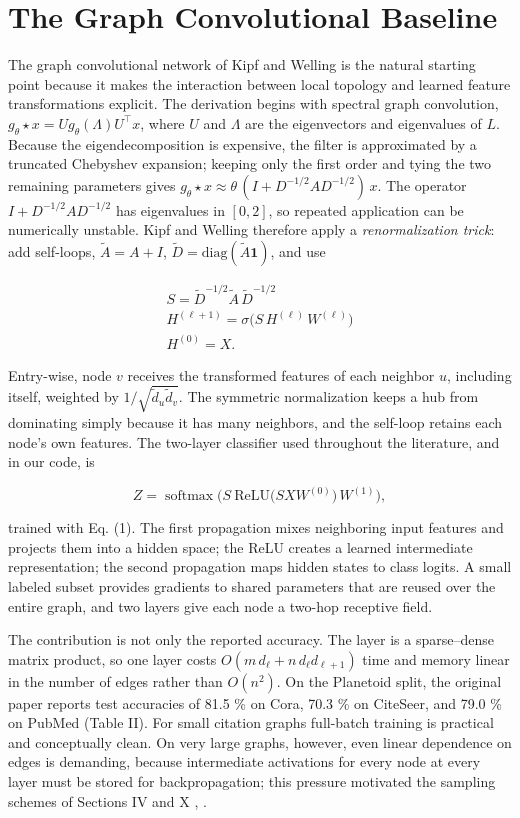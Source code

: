 \documentclass[conference]{IEEEtran}
\begin{document}
\section{The Graph Convolutional Baseline}

The graph convolutional network of Kipf and Welling \cite{b1} is the natural starting point because it makes the interaction between local topology and learned feature transformations explicit. The derivation begins with spectral graph convolution, \(g_\theta \star x = U g_\theta(\Lambda) U^\top x\), where \(U\) and \(\Lambda\) are the eigenvectors and eigenvalues of \(L\). Because the eigendecomposition is expensive, the filter is approximated by a truncated Chebyshev expansion; keeping only the first order and tying the two remaining parameters gives \(g_\theta\star x \approx \theta\,(I + D^{-1/2}AD^{-1/2})\,x\). The operator \(I + D^{-1/2}AD^{-1/2}\) has eigenvalues in \([0,2]\), so repeated application can be numerically unstable. Kipf and Welling therefore apply a \emph{renormalization trick}: add self-loops, \(\tilde A = A + I\), \(\tilde D = \mathrm{diag}(\tilde A\mathbf{1})\), and use

\[\begin{gathered}S = \tilde D^{-1/2}\tilde A\,\tilde D^{-1/2} \\ H^{(\ell+1)} = \sigma\big(S\,H^{(\ell)}\,W^{(\ell)}\big) \\ H^{(0)} = X.\end{gathered}\tag{4}\]

Entry-wise, node \(v\) receives the transformed features of each neighbor \(u\), including itself, weighted by \(1/\sqrt{\tilde d_u \tilde d_v}\). The symmetric normalization keeps a hub from dominating simply because it has many neighbors, and the self-loop retains each node's own features. The two-layer classifier used throughout the literature, and in our code, is

\[Z = \operatorname{softmax}\Big(S\ \mathrm{ReLU}\big(S X W^{(0)}\big)\, W^{(1)}\Big), \tag{5}\]

trained with Eq. (1). The first propagation mixes neighboring input features and projects them into a hidden space; the ReLU creates a learned intermediate representation; the second propagation maps hidden states to class logits. A small labeled subset provides gradients to shared parameters that are reused over the entire graph, and two layers give each node a two-hop receptive field.

The contribution is not only the reported accuracy. The layer is a sparse--dense matrix product, so one layer costs \(O(m\,d_\ell + n\,d_\ell d_{\ell+1})\) time and memory linear in the number of edges rather than \(O(n^2)\). On the Planetoid split, the original paper reports test accuracies of 81.5 \% on Cora, 70.3 \% on CiteSeer, and 79.0 \% on PubMed \cite{b1} (Table II). For small citation graphs full-batch training is practical and conceptually clean. On very large graphs, however, even linear dependence on edges is demanding, because intermediate activations for every node at every layer must be stored for backpropagation; this pressure motivated the sampling schemes of Sections IV and X \cite{b2}, \cite{b8}.
\end{document}
